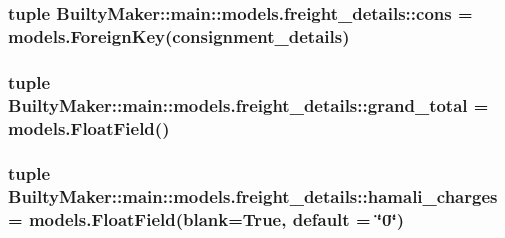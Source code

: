 \hypertarget{classBuiltyMaker_1_1main_1_1models_1_1freight__details_a78f12f414367eb324de4575ab3c3b436}{
\subsubsection[{cons}]{\setlength{\rightskip}{0pt plus 5cm}tuple {\bf \-Builty\-Maker\-::main\-::models.\-freight\-\_\-details\-::cons} = models.\-Foreign\-Key({\bf consignment\-\_\-details})}}\label{classBuiltyMaker_1_1main_1_1models_1_1freight__details_a78f12f414367eb324de4575ab3c3b436}
\hypertarget{classBuiltyMaker_1_1main_1_1models_1_1freight__details_a43110af05160e574cb628342e3b0f133}{
\subsubsection[{grand\-\_\-total}]{\setlength{\rightskip}{0pt plus 5cm}tuple {\bf \-Builty\-Maker\-::main\-::models.\-freight\-\_\-details\-::grand\-\_\-total} = models.\-Float\-Field()}}\label{classBuiltyMaker_1_1main_1_1models_1_1freight__details_a43110af05160e574cb628342e3b0f133}
\hypertarget{classBuiltyMaker_1_1main_1_1models_1_1freight__details_a3f5b570b4f3d9614fe3d47978d0a097e}{
\subsubsection[{hamali\-\_\-charges}]{\setlength{\rightskip}{0pt plus 5cm}tuple {\bf \-Builty\-Maker\-::main\-::models.\-freight\-\_\-details\-::hamali\-\_\-charges} = models.\-Float\-Field(blank=\-True, default = \char`\"{}0\char`\"{})}}\label{classBuiltyMaker_1_1main_1_1models_1_1freight__details_a3f5b570b4f3d9614fe3d47978d0a097e}
